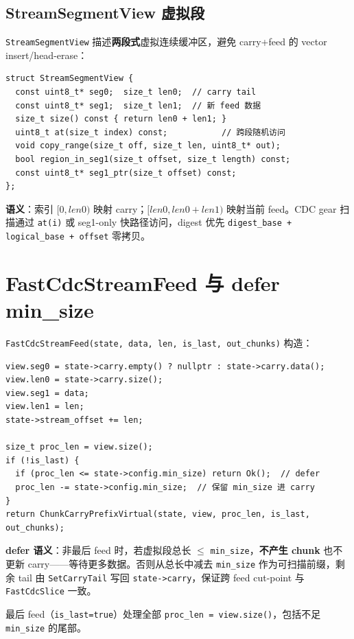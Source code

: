 \subsection{StreamSegmentView 虚拟段}

\texttt{StreamSegmentView} 描述\textbf{两段式}虚拟连续缓冲区，避免 carry+feed 的 vector insert/head-erase：

\begin{lstlisting}[caption={StreamSegmentView 核心 API},label={lst:stream-segment-view}]
struct StreamSegmentView {
  const uint8_t* seg0;  size_t len0;  // carry tail
  const uint8_t* seg1;  size_t len1;  // 新 feed 数据
  size_t size() const { return len0 + len1; }
  uint8_t at(size_t index) const;           // 跨段随机访问
  void copy_range(size_t off, size_t len, uint8_t* out);
  bool region_in_seg1(size_t offset, size_t length) const;
  const uint8_t* seg1_ptr(size_t offset) const;
};
\end{lstlisting}

\textbf{语义}：索引 $[0, len0)$ 映射 carry；$[len0, len0+len1)$ 映射当前 feed。CDC gear 扫描通过 \texttt{at(i)} 或 seg1-only 快路径访问，digest 优先 \texttt{digest\_base + logical\_base + offset} 零拷贝。

\section{FastCdcStreamFeed 与 defer min\_size}

\texttt{FastCdcStreamFeed(state, data, len, is\_last, out\_chunks)} 构造：
\begin{lstlisting}[caption={Feed 入口},label={lst:stream-feed}]
view.seg0 = state->carry.empty() ? nullptr : state->carry.data();
view.len0 = state->carry.size();
view.seg1 = data;
view.len1 = len;
state->stream_offset += len;

size_t proc_len = view.size();
if (!is_last) {
  if (proc_len <= state->config.min_size) return Ok();  // defer
  proc_len -= state->config.min_size;  // 保留 min_size 进 carry
}
return ChunkCarryPrefixVirtual(state, view, proc_len, is_last, out_chunks);
\end{lstlisting}

\textbf{defer 语义}：非最后 feed 时，若虚拟段总长 $\leq$ \texttt{min\_size}，\textbf{不产生 chunk} 也不更新 carry——等待更多数据。否则从总长中减去 \texttt{min\_size} 作为可扫描前缀，剩余 tail 由 \texttt{SetCarryTail} 写回 \texttt{state->carry}，保证跨 feed cut-point 与 \texttt{FastCdcSlice} 一致。

最后 feed（\texttt{is\_last=true}）处理全部 \texttt{proc\_len = view.size()}，包括不足 \texttt{min\_size} 的尾部。

